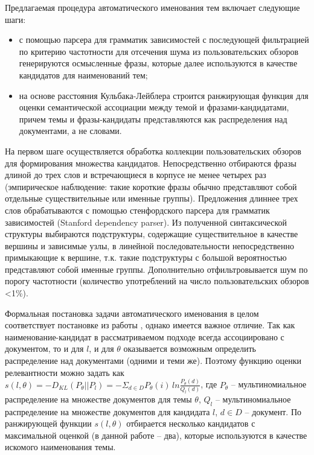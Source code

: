 Предлагаемая процедура автоматического именования тем включает следующие шаги:
\begin{itemize}
    \item с помощью парсера для грамматик зависимостей с последующей фильтрацией по критерию частотности для отсечения шума из пользовательских обзоров генерируются осмысленные фразы, которые далее используются в качестве кандидатов для наименований тем;
    \item на основе расстояния Кульбака-Лейблера строится ранжирующая функция для оценки семантической ассоциации между темой и фразами-кандидатами, причем темы и фразы-кандидаты представляются как распределения над документами, а не словами.
\end{itemize} 

На первом шаге осуществляется обработка коллекции пользовательских обзоров для формирования множества кандидатов. Непосредственно отбираются фразы длиной до трех слов и встречающиеся в корпусе не менее четырех раз (эмпирическое наблюдение: такие короткие фразы обычно представляют собой отдельные существительные или именные группы). Предложения длиннее трех слов обрабатываются с помощью стенфордского парсера для грамматик зависимостей (Stanford dependency parser). Из полученной синтаксической структуры выбираются подструктуры, содержащие существительное в качестве вершины и зависимые узлы, в линейной последовательности непосредственно примыкающие к вершине, т.к. такие подструктуры с большой вероятностью представляют собой именные группы. Дополнительно отфильтровывается шум по порогу частотности (количество употреблений на число пользовательских обзоров <1\%).

Формальная постановка задачи автоматического именования в целом соответствует постановке из работы \parencite{mei2007automatic}, однако имеется важное отличие. Так как наименование-кандидат в рассматриваемом подходе всегда ассоциировано с документом, то и для $l$, и для $\theta$ оказывается возможным определить распределение над документами (одними и теми же). Поэтому функцию оценки релевантности можно задать как $s(l, \theta) = -D_{KL}(P_\theta||P_l) = -\Sigma_{d \in D}P_\theta(i)\,ln\frac{P_\theta(d)}{Q_l(d)}$, где $P_\theta$ -- мультиномиальное распределение на множестве документов для темы $\theta$, $Q_l$ -- мультиномиальное распределение на множестве документов для кандидата $l$, $d \in D$ -- документ. По ранжирующей функции $s(l, \theta)$ отбирается несколько кандидатов с максимальной оценкой (в данной работе -- два), которые используются в качестве искомого наименования темы.

